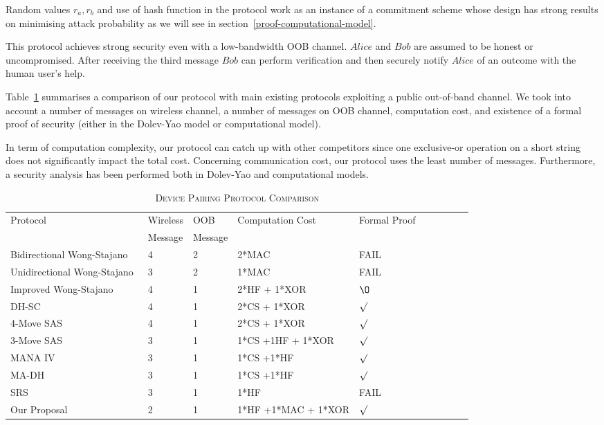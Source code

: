 Random values $r_a, r_b$ and use of hash function in the protocol work as an instance of a commitment scheme whose design has strong results on minimising attack probability as we will see in section~\ref{proof-computational-model}. 

This protocol achieves strong security even with a low-bandwidth OOB channel. $Alice$ and $Bob$ are assumed to be honest or uncompromised. After receiving the third message $Bob$ can perform verification and then securely notify $Alice$ of an outcome with the human user's help. 

Table~\ref{devcom} summarises a comparison of our protocol with main existing protocols exploiting a public out-of-band channel. We took into account a number of messages on wireless channel, a number of messages on OOB channel, computation cost, and existence of a formal proof of security (either in the Dolev-Yao model or computational model). 

In term of computation complexity, our protocol can catch up with other competitors since one exclusive-or operation on a short string does not significantly impact the total cost. Concerning communication cost, our protocol uses the least number of messages. Furthermore, a security 
analysis has been performed both in Dolev-Yao and computational models.

\begin{table}[ht] 
\centering
\caption{\textsc{Device Pairing Protocol Comparison}}
\label{devcom}
{\scriptsize
\begin{tabular}{ p{5cm} l l l l l p{1cm} l p{1cm} l }
\hline
Protocol & Wireless & OOB & Computation Cost & Formal Proof \\
  & Message & Message & & \\
\hline\hline
Bidirectional Wong-Stajano~\cite{10.1109/MPRV.2007.76} & 4 & 2 & 2*MAC & FAIL \\ \hline
Unidirectional Wong-Stajano~\cite{10.1109/MPRV.2007.76} & 3 & 2 & 1*MAC & FAIL \\ \hline
Improved Wong-Stajano~\cite{Nguyen09authenticationprotocols} & 4 & 1 & 2*HF + 1*XOR & $\O$ \\ \hline
DH-SC~\cite{1580514} & 4 & 1 & 2*CS + 1*XOR & $\surd$ \\ \hline
4-Move SAS~\cite{Vaudenay:2005qa} & 4 & 1 & 2*CS + 1*XOR & $\surd$ \\ \hline
3-Move SAS~\cite{Vaudenay:2005qa} & 3 & 1 & 1*CS +1HF + 1*XOR & $\surd$ \\ \hline
MANA IV~\cite{Laur:2006kl} & 3 & 1 & 1*CS +1*HF & $\surd$ \\ \hline
MA-DH~\cite{Laur:2006kl} & 3 & 1 & 1*CS +1*HF & $\surd$ \\ \hline
SRS~\cite{5678019} &3 & 1 & 1*HF &FAIL \\ \hline 
Our Proposal & 2 & 1 & 1*HF +1*MAC + 1*XOR & $\surd$ \\ \hline
\end{tabular}
}
\end{table}

